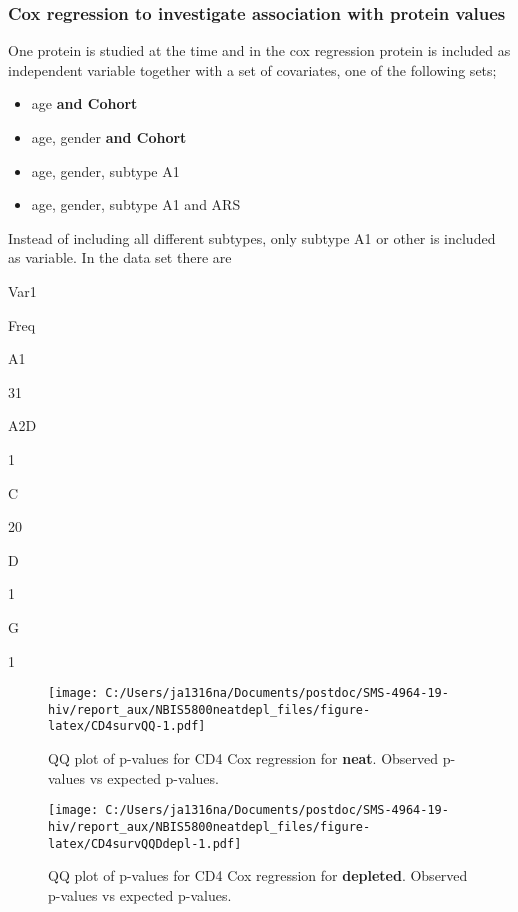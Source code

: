 \documentclass[
]{article}
\providecommand{\tightlist}{%
  \setlength{\itemsep}{0pt}\setlength{\parskip}{0pt}}
\begin{document}
\FloatBarrier

\hypertarget{cox-regression-to-investigate-association-with-protein-values}{%
\subsubsection{Cox regression to investigate association with protein values}\label{cox-regression-to-investigate-association-with-protein-values}}

One protein is studied at the time and in the cox regression protein is included as independent variable together with a set of covariates, one of the following sets;

\begin{itemize}
\tightlist
\item
  age \textbf{and Cohort}
\item
  age, gender \textbf{and Cohort}
\item
  age, gender, subtype A1
\item
  age, gender, subtype A1 and ARS
\end{itemize}

Instead of including all different subtypes, only subtype A1 or other is included as variable. In the data set there are

Var1

Freq

A1

31

A2D

1

C

20

D

1

G

1

\begin{figure}
\centering
\texttt{[image: C:/Users/ja1316na/Documents/postdoc/SMS-4964-19-hiv/report\_aux/NBIS5800neatdepl\_files/figure-latex/CD4survQQ-1.pdf]}
\caption{\label{fig:CD4survQQ}QQ plot of p-values for CD4 Cox regression for \textbf{neat}. Observed p-values vs expected p-values.}
\end{figure}

\begin{figure}
\centering
\texttt{[image: C:/Users/ja1316na/Documents/postdoc/SMS-4964-19-hiv/report\_aux/NBIS5800neatdepl\_files/figure-latex/CD4survQQDdepl-1.pdf]}
\caption{\label{fig:CD4survQQDdepl}QQ plot of p-values for CD4 Cox regression for \textbf{depleted}. Observed p-values vs expected p-values.}
\end{figure}
\end{document}
